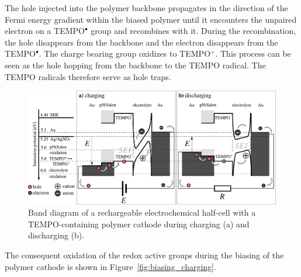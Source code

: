 The hole injected into the polymer backbone propagates in the direction of the Fermi energy gradient within the biased polymer until it encounters the unpaired electron on a TEMPO$^{\bullet}$ group and recombines with it. During the recombination, the hole disappears from the backbone and the electron disappears from the TEMPO$^{\bullet}$. The charge bearing group oxidizes to TEMPO$^+$. This process can be seen as the hole hopping from the backbone to the TEMPO radical. The TEMPO radicals therefore serve as hole traps.

\begin{figure}[!ht]
\center
	\includegraphics[width=1\textwidth]{./electrochemistry/figures/band_diagram.pdf}
	\caption{Band diagram of a rechargeable electrochemical half-cell with a TEMPO-containing polymer cathode during charging (a) and discharging (b).}
	\label{fig:band_diagram}
\end{figure}

The consequent oxidation of the redox active groups during the biasing of the polymer cathode is shown in Figure~\ref{fig:biasing_charging}.

